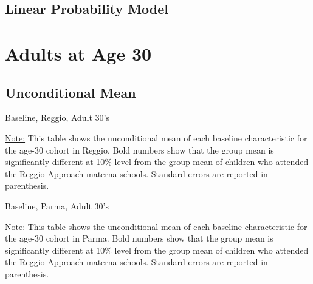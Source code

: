 \documentclass[12pt]{article}
\begin{document}
\subsection{Linear Probability Model}






\section{Adults at Age 30}
\subsection{Unconditional Mean}
\begin{table}[H]
\caption{Baseline, Reggio, Adult 30's} \label{tab:base-reggio-age30}
\begin{center}
\scalebox{0.8}{

}
\end{center}
\begin{footnotesize}
\vspace{0.5mm} 

\underline{Note:} This table shows the unconditional mean of each baseline characteristic for the age-30 cohort in Reggio. Bold numbers show that the group mean is significantly different at 10\% level from the group mean of children who attended the Reggio Approach materna schools. Standard errors are reported in parenthesis. 
\end{footnotesize}
\end{table}

\begin{table}[H]
\caption{Baseline, Parma, Adult 30's} \label{tab:base-parma-age30}
\begin{center}
\scalebox{0.8}{

}
\end{center}
\begin{footnotesize}
\vspace{0.5mm} 

\underline{Note:} This table shows the unconditional mean of each baseline characteristic for the age-30 cohort in Parma. Bold numbers show that the group mean is significantly different at 10\% level from the group mean of children who attended the Reggio Approach materna schools. Standard errors are reported in parenthesis. 
\end{footnotesize}
\end{table}
\end{document}
